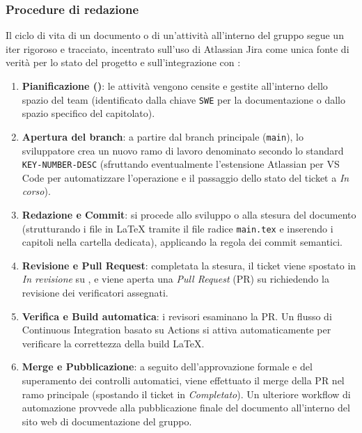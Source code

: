 \subsubsection{Procedure di redazione}
Il ciclo di vita di un documento o di un'attività all'interno del gruppo segue un iter rigoroso e tracciato, incentrato sull'uso di Atlassian Jira come unica fonte di verità per lo stato del progetto e sull'integrazione con :
\begin{enumerate}
    \item \textbf{Pianificazione ()}: le attività vengono censite e gestite all'interno dello spazio  del team (identificato dalla chiave \texttt{SWE} per la documentazione o dallo spazio specifico del capitolato).
    \item \textbf{Apertura del branch}: a partire dal branch principale (\texttt{main}), lo sviluppatore crea un nuovo ramo di lavoro denominato secondo lo standard \texttt{KEY-NUMBER-DESC} (sfruttando eventualmente l'estensione Atlassian per VS Code per automatizzare l'operazione e il passaggio dello stato del ticket a \emph{In corso}).
    \item \textbf{Redazione e Commit}: si procede allo sviluppo o alla stesura del documento (strutturando i file in LaTeX tramite il file radice \texttt{main.tex} e inserendo i capitoli nella cartella dedicata), applicando la regola dei commit semantici.
    \item \textbf{Revisione e Pull Request}: completata la stesura, il ticket viene spostato in \emph{In revisione} su , e viene aperta una \emph{Pull Request} (PR) su  richiedendo la revisione dei verificatori assegnati.
    \item \textbf{Verifica e Build automatica}: i revisori esaminano la PR. Un flusso di Continuous Integration basato su  Actions si attiva automaticamente per verificare la correttezza della build LaTeX.
    \item \textbf{Merge e Pubblicazione}: a seguito dell'approvazione formale e del superamento dei controlli automatici, viene effettuato il merge della PR nel ramo principale (spostando il ticket  in \emph{Completato}). Un ulteriore workflow di automazione provvede alla pubblicazione finale del documento all'interno del sito web di documentazione del gruppo.
\end{enumerate}

